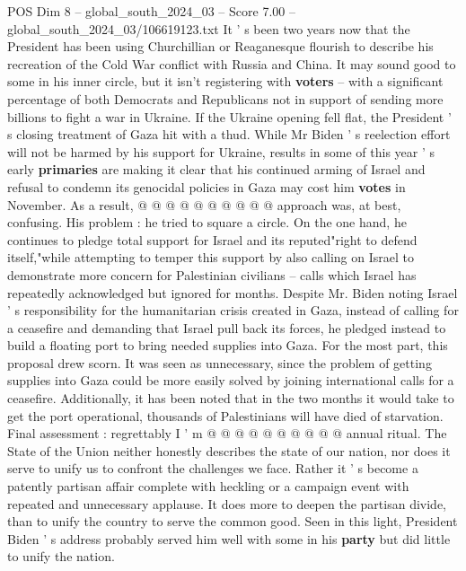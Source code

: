 \begin{textsample}{POS Dim 8 – global\_south\_2024\_03 – Score 7.00 – global\_south\_2024\_03/106619123.txt}
It ' s been two years now that the President has been using Churchillian or Reaganesque flourish to describe his recreation of the Cold War conflict with Russia and China.
It may sound good to some in his inner circle, but it isn't registering with \textbf{voters} -- with a significant percentage of both Democrats and Republicans not in support of sending more billions to fight a war in Ukraine.
If the Ukraine opening fell flat, the President ' s closing treatment of Gaza hit with a thud.
While Mr Biden ' s reelection effort will not be harmed by his support for Ukraine, results in some of this year ' s early \textbf{primaries} are making it clear that his continued arming of Israel and refusal to condemn its genocidal policies in Gaza may cost him \textbf{votes} in November.
As a result, @ @ @ @ @ @ @ @ @ @ approach was, at best, confusing.
His problem : he tried to square a circle.
On the one hand, he continues to pledge total support for Israel and its reputed"right to defend itself,"while attempting to temper this support by also calling on Israel to demonstrate more concern for Palestinian civilians -- calls which Israel has repeatedly acknowledged but ignored for months.
Despite Mr.
Biden noting Israel ' s responsibility for the humanitarian crisis created in Gaza, instead of calling for a ceasefire and demanding that Israel pull back its forces, he pledged instead to build a floating port to bring needed supplies into Gaza.
For the most part, this proposal drew scorn.
It was seen as unnecessary, since the problem of getting supplies into Gaza could be more easily solved by joining international calls for a ceasefire.
Additionally, it has been noted that in the two months it would take to get the port operational, thousands of Palestinians will have died of starvation.
Final assessment : regrettably I ' m @ @ @ @ @ @ @ @ @ @ annual ritual.
The State of the Union neither honestly describes the state of our nation, nor does it serve to unify us to confront the challenges we face.
Rather it ' s become a patently partisan affair complete with heckling or a campaign event with repeated and unnecessary applause.
It does more to deepen the partisan divide, than to unify the country to serve the common good.
Seen in this light, President Biden ' s address probably served him well with some in his \textbf{party} but did little to unify the nation.

\end{textsample}
